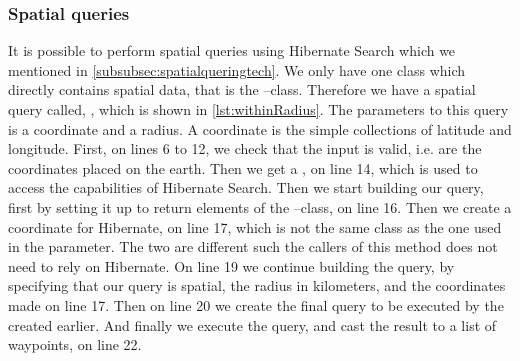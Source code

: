 \subsubsection*{Spatial queries}\label{subsubsec:spatial}
It is possible to perform spatial queries using Hibernate Search which we mentioned in \cref{subsubsec:spatialqueringtech}.
We only have one class which directly contains spatial data, that is the --class.
Therefore we have a spatial query called, , which is shown in \cref{lst:withinRadius}.
The parameters to this query is a coordinate and a radius.
A coordinate is the simple collections of latitude and longitude.
First, on lines 6 to 12, we check that the input is valid, i.e. are the coordinates placed on the earth.
Then we get a , on line 14, which is used to access the capabilities of Hibernate Search.
Then we start building our query, first by setting it up to return elements of the --class, on line 16.
Then we create a coordinate for Hibernate, on line 17, which is not the same class as the one used in the parameter.
The two are different such the callers of this method does not need to rely on Hibernate.
On line 19 we continue building the query, by specifying that our query is spatial, the radius in kilometers, and the coordinates made on line 17.
Then on line 20 we create the final query to be executed by the  created earlier.
And finally we execute the query, and cast the result to a list of waypoints, on line 22.
